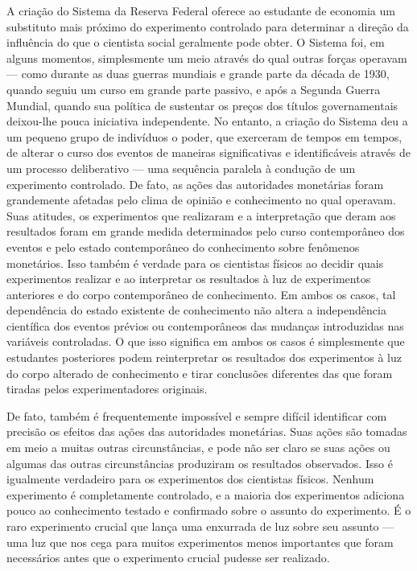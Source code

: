 \documentclass[12pt]{article}
\begin{document}
A criação do Sistema da Reserva Federal oferece ao estudante de economia um substituto mais próximo do experimento controlado para determinar a direção da influência do que o cientista social geralmente pode obter. O Sistema foi, em alguns momentos, simplesmente um meio através do qual outras forças operavam — como durante as duas guerras mundiais e grande parte da década de 1930, quando seguiu um curso em grande parte passivo, e após a Segunda Guerra Mundial, quando sua política de sustentar os preços dos títulos governamentais deixou-lhe pouca iniciativa independente. No entanto, a criação do Sistema deu a um pequeno grupo de indivíduos o poder, que exerceram de tempos em tempos, de alterar o curso dos eventos de maneiras significativas e identificáveis através de um processo deliberativo — uma sequência paralela à condução de um experimento controlado. De fato, as ações das autoridades monetárias foram grandemente afetadas pelo clima de opinião e conhecimento no qual operavam. Suas atitudes, os experimentos que realizaram e a interpretação que deram aos resultados foram em grande medida determinados pelo curso contemporâneo dos eventos e pelo estado contemporâneo do conhecimento sobre fenômenos monetários. Isso também é verdade para os cientistas físicos ao decidir quais experimentos realizar e ao interpretar os resultados à luz de experimentos anteriores e do corpo contemporâneo de conhecimento. Em ambos os casos, tal dependência do estado existente de conhecimento não altera a independência científica dos eventos prévios ou contemporâneos das mudanças introduzidas nas variáveis controladas. O que isso significa em ambos os casos é simplesmente que estudantes posteriores podem reinterpretar os resultados dos experimentos à luz do corpo alterado de conhecimento e tirar conclusões diferentes das que foram tiradas pelos experimentadores originais.

De fato, também é frequentemente impossível e sempre difícil identificar com precisão os efeitos das ações das autoridades monetárias. Suas ações são tomadas em meio a muitas outras circunstâncias, e pode não ser claro se suas ações ou algumas das outras circunstâncias produziram os resultados observados. Isso é igualmente verdadeiro para os experimentos dos cientistas físicos. Nenhum experimento é completamente controlado, e a maioria dos experimentos adiciona pouco ao conhecimento testado e confirmado sobre o assunto do experimento. É o raro experimento crucial que lança uma enxurrada de luz sobre seu assunto — uma luz que nos cega para muitos experimentos menos importantes que foram necessários antes que o experimento crucial pudesse ser realizado.
\end{document}
